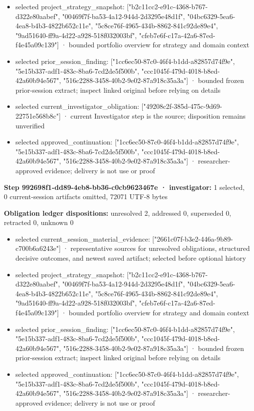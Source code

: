 \documentclass[11pt]{article}
\begin{document}
\begin{itemize}
\item selected project\_strategy\_snapshot: ["b2c11cc2-e91c-4368-b767-d322e80aabef", "00469f7f-ba53-4a12-944d-2d3295e48d1f", "04bc6329-5ea6-4ea8-b4b3-4822b652c11e", "5c8ce76f-4965-434b-8862-841c92de89e4", "9ad51640-ff9a-4d22-a928-518f032003bf", "cfeb7e6f-c17a-42a6-87ed-f4e45a09c139"] · bounded portfolio overview for strategy and domain context
\item selected prior\_session\_finding: ["1cc6ec50-87c0-46f4-b1dd-a82857d74f9e", "5e15b337-adf1-483c-8ba6-7cd2de5f500b", "ccc1045f-479d-4018-b8ed-42a60b94e567", "516c2288-3458-40b2-9e02-87a918c35a3a"] · bounded frozen prior-session extract; inspect linked original before relying on details
\item selected current\_investigator\_obligation: ["49208c2f-385d-475c-9d69-22751e568b8c"] · current Investigator step is the source; disposition remains unverified
\item selected approved\_continuation: ["1cc6ec50-87c0-46f4-b1dd-a82857d74f9e", "5e15b337-adf1-483c-8ba6-7cd2de5f500b", "ccc1045f-479d-4018-b8ed-42a60b94e567", "516c2288-3458-40b2-9e02-87a918c35a3a"] · researcher-approved evidence; delivery is not use or proof
\end{itemize}
\textbf{Step 992698f1-dd89-4eb8-bb36-c0cb9623467e · investigator:} 1 selected, 0 current-session artifacts omitted, 72071 UTF-8 bytes\par
\textbf{Obligation ledger dispositions:} unresolved 2, addressed 0, superseded 0, retracted 0, unknown 0\par
\begin{itemize}
\item selected current\_session\_material\_evidence: ["2661c07f-b3e2-446a-9b89-c700b6a6243e"] · representative sources for unresolved obligations, structured decisive outcomes, and newest saved artifact; selected before optional history
\item selected project\_strategy\_snapshot: ["b2c11cc2-e91c-4368-b767-d322e80aabef", "00469f7f-ba53-4a12-944d-2d3295e48d1f", "04bc6329-5ea6-4ea8-b4b3-4822b652c11e", "5c8ce76f-4965-434b-8862-841c92de89e4", "9ad51640-ff9a-4d22-a928-518f032003bf", "cfeb7e6f-c17a-42a6-87ed-f4e45a09c139"] · bounded portfolio overview for strategy and domain context
\item selected prior\_session\_finding: ["1cc6ec50-87c0-46f4-b1dd-a82857d74f9e", "5e15b337-adf1-483c-8ba6-7cd2de5f500b", "ccc1045f-479d-4018-b8ed-42a60b94e567", "516c2288-3458-40b2-9e02-87a918c35a3a"] · bounded frozen prior-session extract; inspect linked original before relying on details
\item selected approved\_continuation: ["1cc6ec50-87c0-46f4-b1dd-a82857d74f9e", "5e15b337-adf1-483c-8ba6-7cd2de5f500b", "ccc1045f-479d-4018-b8ed-42a60b94e567", "516c2288-3458-40b2-9e02-87a918c35a3a"] · researcher-approved evidence; delivery is not use or proof
\end{itemize}
\end{document}
